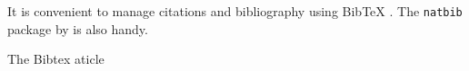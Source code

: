 \documentclass{article}
\begin{document}
 It is convenient to manage citations and bibliography using BibTeX \citep{fenn2006managing}. The \texttt{natbib} package by \citet{daly2010natbib} is also handy.
 
 The Bibtex aticle \citep{bibtexarticle}
 
\end{document}
